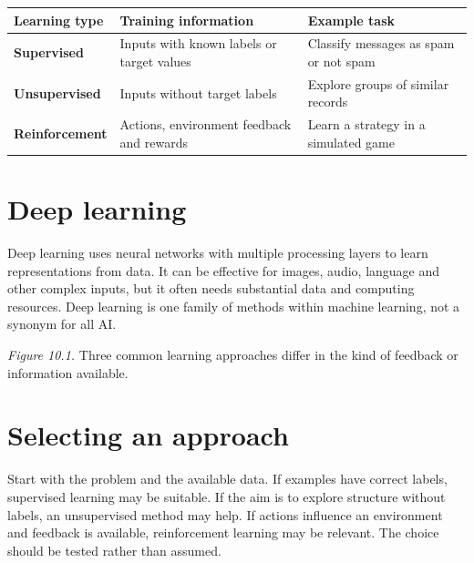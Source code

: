 \documentclass[11pt,openany,oneside]{book}
\begin{document}
\begin{center}
\begin{tabularx}{\textwidth}{>{\bfseries}p{} X X}
\toprule
Learning type & Training information & Example task\\
\midrule
Supervised & Inputs with known labels or target values & Classify messages as spam or not spam\\
Unsupervised & Inputs without target labels & Explore groups of similar records\\
Reinforcement & Actions, environment feedback and rewards & Learn a strategy in a simulated game\\
\bottomrule
\end{tabularx}
\end{center}

\section{Deep learning}
Deep learning uses neural networks with multiple processing layers to learn representations from data. It can be effective for images, audio, language and other complex inputs, but it often needs substantial data and computing resources. Deep learning is one family of methods within machine learning, not a synonym for all AI.

\begin{center}
\end{center}
\textit{Figure 10.1.} Three common learning approaches differ in the kind of feedback or information available.

\section{Selecting an approach}
Start with the problem and the available data. If examples have correct labels, supervised learning may be suitable. If the aim is to explore structure without labels, an unsupervised method may help. If actions influence an environment and feedback is available, reinforcement learning may be relevant. The choice should be tested rather than assumed.
\end{document}

